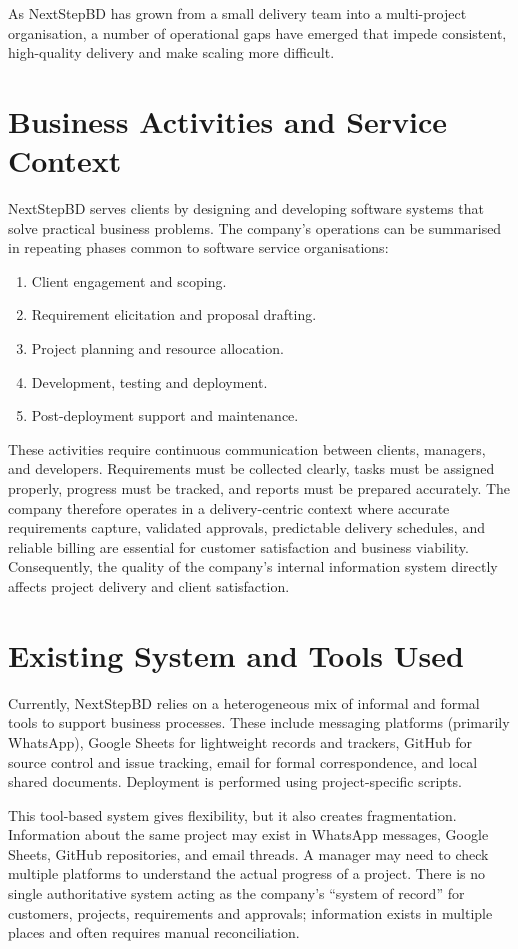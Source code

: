\documentclass[12pt,a4paper]{report}
\begin{document}
As NextStepBD has grown from a small delivery team into a multi-project organisation, a number of operational gaps have emerged that impede consistent, high-quality delivery and make scaling more difficult.

\section{Business Activities and Service Context}
NextStepBD serves clients by designing and developing software systems that solve practical business problems. The company's operations can be summarised in repeating phases common to software service organisations:

\begin{enumerate}[leftmargin=2em]
    \item Client engagement and scoping.
    \item Requirement elicitation and proposal drafting.
    \item Project planning and resource allocation.
    \item Development, testing and deployment.
    \item Post-deployment support and maintenance.
\end{enumerate}

These activities require continuous communication between clients, managers, and developers. Requirements must be collected clearly, tasks must be assigned properly, progress must be tracked, and reports must be prepared accurately. The company therefore operates in a delivery-centric context where accurate requirements capture, validated approvals, predictable delivery schedules, and reliable billing are essential for customer satisfaction and business viability. Consequently, the quality of the company's internal information system directly affects project delivery and client satisfaction.

\section{Existing System and Tools Used}
Currently, NextStepBD relies on a heterogeneous mix of informal and formal tools to support business processes. These include messaging platforms (primarily WhatsApp), Google Sheets for lightweight records and trackers, GitHub for source control and issue tracking, email for formal correspondence, and local shared documents. Deployment is performed using project-specific scripts.

This tool-based system gives flexibility, but it also creates fragmentation. Information about the same project may exist in WhatsApp messages, Google Sheets, GitHub repositories, and email threads. A manager may need to check multiple platforms to understand the actual progress of a project. There is no single authoritative system acting as the company's ``system of record'' for customers, projects, requirements and approvals; information exists in multiple places and often requires manual reconciliation.
\end{document}
